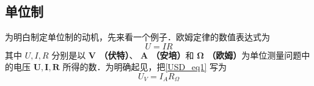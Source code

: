
\subsection{单位制}
为明白制定单位制的动机，先来看一个例子．欧姆定律的数值表达式为
\begin{equation}\label{USD_eq1}
U=IR
\end{equation}
其中 $U,I,R$ 分别是以 \textbf{$\boldsymbol{V}$ （伏特）}、\textbf{ $\boldsymbol{A}$ （安培）}和\textbf{ $\boldsymbol{\Omega}$ （欧姆）}为单位测量问题中的电压 $\boldsymbol{U},\boldsymbol{I},\boldsymbol{R}$ 所得的数．为明确起见，把\autoref{USD_eq1} 写为
\begin{equation}
U_{V}=I_{A}R_{\Omega}
\end{equation}
